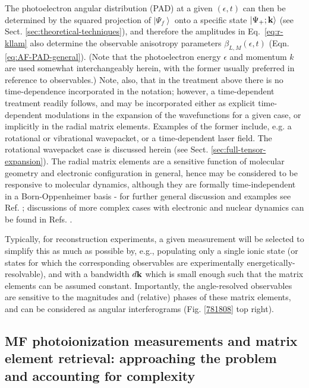\documentclass[10pt]{article}
\begin{document}
The photoelectron angular distribution (PAD) at a given $(\epsilon,t)$ can then be determined by the squared projection of $\left|\Psi_f\right>$ onto a specific state $\left|\Psi_{+};\bf{k}\right>$ (see Sect. \ref{sec:theoretical-techniques}), and therefore the amplitudes in Eq.~\ref{eq:r-kllam} also determine the observable anisotropy parameters $\beta_{L,M}(\epsilon,t)$ (Eqn. \ref{eq:AF-PAD-general}). (Note that the photoelectron energy $\epsilon$ and momentum $k$ are used somewhat interchangeably herein, with the former usually preferred in reference to observables.) Note, also, that in the treatment above there is no time-dependence incorporated in the notation; however, a time-dependent treatment readily follows, and may be incorporated either as explicit time-dependent modulations in the expansion of the wavefunctions for a given case, or implicitly in the radial matrix elements. Examples of the former include, e.g. a rotational or vibrational wavepacket, or a time-dependent laser field. The rotational wavepacket case is discussed herein (see Sect. \ref{sec:full-tensor-expansion}). The radial matrix elements are a sensitive function of molecular geometry and electronic configuration in general, hence may be considered to be responsive to molecular dynamics, although they are formally time-independent in a Born-Oppenheimer basis - for further general discussion and examples see Ref. \cite{wu2011TimeresolvedPhotoelectronSpectroscopy}; discussions of more complex cases with electronic and nuclear dynamics can be found in Refs.  \cite{arasaki2000ProbingWavepacketDynamics,Seideman2001, Suzuki2001,Stolow2008}.

Typically, for reconstruction experiments, a given measurement will be selected to simplify this as much as possible by, e.g., populating only a single ionic state (or states for which the corresponding observables are experimentally energetically-resolvable), and with a bandwidth $d\bf{k}$ which is small enough such that the matrix elements can be assumed constant. Importantly, the angle-resolved observables are sensitive to the magnitudes and (relative) phases of these matrix elements, and can be considered as angular interferograms (Fig. \ref{781808} top right).


\subsection{MF photoionization measurements and matrix element retrieval: approaching the problem and accounting for complexity\label{sec:MF-recon-basic-intro}}
\end{document}
